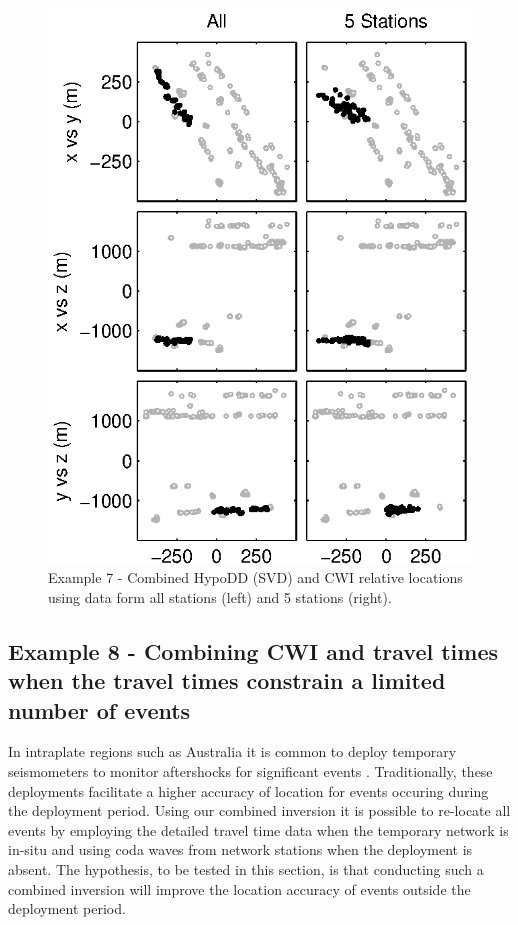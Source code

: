 \documentclass[extra, onecolumn, doublespacing]{gji}
\begin{document}
\begin{figure}
\includegraphics{diags/CalaverasLoc5_hypoDD_SVD.eps}
\caption{Example 7 - Combined HypoDD (SVD) and CWI relative
locations using data form all stations (left) and 5 stations
(right).} \label{fig-68Calaverasevents_ttandcoda1}
\end{figure}




\subsection{Example 8 - Combining CWI and travel times when the travel times constrain a limited number of events}


In intraplate regions such as Australia it is common to deploy
temporary seismometers to monitor aftershocks for significant events
\citep{dr_Bowman90a, dr_Leonard02a}. Traditionally, these
deployments facilitate a higher accuracy of location for events
occuring during the deployment period. Using our combined inversion
it is possible to re-locate all events by employing the detailed
travel time data when the temporary network is in-situ and using
coda waves from network stations when the deployment is absent. The
hypothesis, to be tested in this section, is that conducting such a
combined inversion will improve the location accuracy of events
outside the deployment period.
\end{document}

